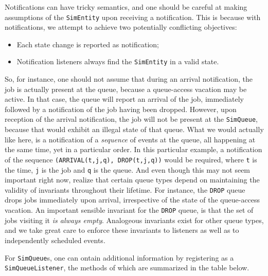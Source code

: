 \documentclass[12pt]{book}
\begin{document}
Notifications can have tricky semantics, and one should be careful
  at making assumptions of the \lstinline|SimEntity|
  upon receiving a notification.
This is because with notifications, we attempt to achieve two potentially conflicting objectives:
\begin{itemize}
\item Each state change is reported as notification;
\item Notification listeners always find the \lstinline|SimEntity| in a valid state.
\end{itemize}
So, for instance, one should not assume that during an arrival notification,
  the job is actually present at the queue,
  because a queue-access vacation may be active.
In that case,
  the queue will report an arrival of the job,
  immediately followed by a notification of the job having been dropped.
However, upon reception of the arrival notification,
  the job will not be present at the \lstinline|SimQueue|,
  because that would exhibit an illegal state of that queue.
What we would actually like here,
  is a notification of a {\em sequence\/} of events at the
  queue, all happening at the same time,
  yet in a particular order.
In this particular example, a notification of the sequence
  \lstinline|(ARRIVAL(t,j,q), DROP(t,j,q))|
  would be required,
  where \lstinline|t| is the time,
  \lstinline|j| is the job
  and \lstinline|q| is the queue.
And even though this may not seem important right now,
  realize that certain queue types depend on maintaining the validity
  of invariants throughout their lifetime.
For instance, the \lstinline|DROP| queue drops jobs immediately upon arrival,
  irrespective of the state of the queue-access vacation.
An important sensible invariant for the \lstinline|DROP| queue,
  is that the set of jobs visiting it {\em is always empty}.
Analogeous invariants exist for other queue types,
  and we take great care to enforce these invariants
  to listeners as well as to independently scheduled events.

For \lstinline|SimQueue|s, one can ontain additional information by registering as
  a \lstinline|SimQueueListener|, the methods of which are summarized in the table below.
\end{document}

